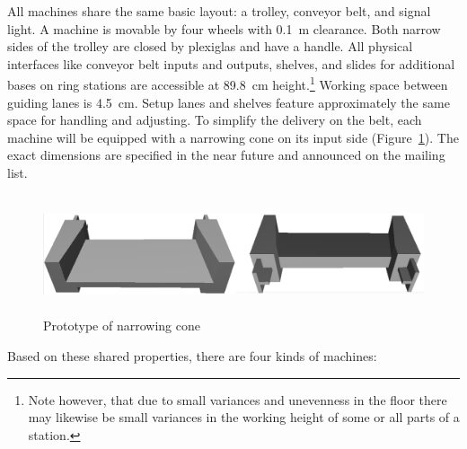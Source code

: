 \documentclass[12pt,twoside]{article}
\newcommand{\reffig}[1]{Figure~\ref{#1}}
\begin{document}
All machines share the same basic layout: a trolley, conveyor belt,
and signal light. A machine is movable by four wheels with
\SI{0.1}{\metre} clearance. Both narrow sides of the trolley are
closed by plexiglas and have a handle. All physical interfaces like
conveyor belt inputs and outputs, shelves, and slides for additional
bases on ring stations are accessible at \SI{89.8}{\centi\metre}
height.\footnote{Note however, that due to small variances and
  unevenness in the floor there may likewise be small variances in the
  working height of some or all parts of a station.} Working space
between guiding lanes is \SI{4.5}{\centi\metre}. Setup lanes and
shelves feature approximately the same space for handling and
adjusting.  To simplify the delivery on the belt, each machine will be
equipped with a narrowing cone on its input side
(\reffig{fig:narrow-cone}). The exact dimensions are specified in the
near future and announced on the mailing list.
\begin{figure}
    \includegraphics[height=3.5cm]{narrowCone.png}
\caption{Prototype of narrowing cone}
\label{fig:narrow-cone}
\end{figure}

Based on these shared properties, there are four kinds of machines:
\end{document}
